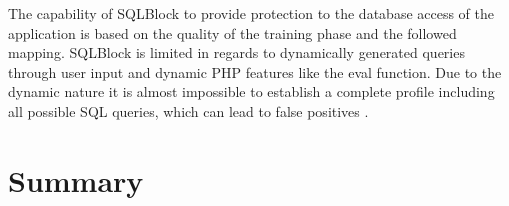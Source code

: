 The capability of SQLBlock to provide protection to the database access of the application is based on the quality of the training phase and the followed mapping. SQLBlock is limited in regards to dynamically generated queries through user input and dynamic PHP features like the eval function. Due to the dynamic nature it is almost impossible to establish a complete profile including all possible SQL queries, which can lead to false positives \autocite[12]{Jahanshahi2018}.

\section{Summary}


